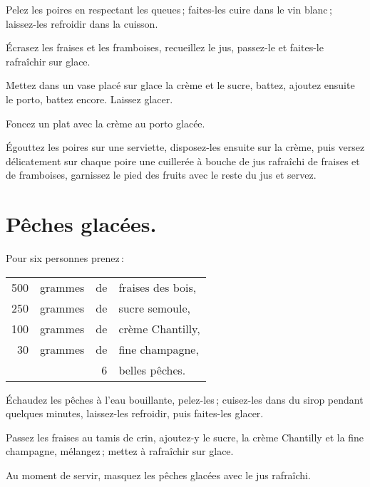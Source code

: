Pelez les poires en respectant les queues ; faites-les cuire dans le vin
blanc ; laissez-les refroidir dans la cuisson.

Écrasez les fraises et les framboises, recueillez le jus, passez-le et
faites-le rafraîchir sur glace.

Mettez dans un vase placé sur glace la crème et le sucre, battez, ajoutez
ensuite le porto, battez encore. Laissez glacer.

Foncez un plat avec la crème au porto glacée.

Égouttez les poires sur une serviette, disposez-les ensuite sur la crème, puis
versez délicatement sur chaque poire une cuillerée à bouche de jus rafraîchi de
fraises et de framboises, garnissez le pied des fruits avec le reste du jus et
servez.

\section*{\centering Pêches glacées.}
{}

Pour six personnes prenez :

\footnotesize
\begin{longtable}{rrrp{16em}}
    500 & grammes & de & fraises des bois,                                                                \\
    250 & grammes & de & sucre semoule,                                                                   \\
    100 & grammes & de & crème Chantilly,                                                                 \\
     30 & grammes & de & fine champagne,                                                                  \\
        &         &  6 & belles pêches.                                                                   \\
\end{longtable}
\normalsize

Échaudez les pêches à l'eau bouillante, pelez-les ; cuisez-les dans du sirop
pendant quelques minutes, laissez-les refroidir, puis faites-les glacer.

Passez les fraises au tamis de crin, ajoutez-y le sucre, la crème Chantilly et
la fine champagne, mélangez ; mettez à rafraîchir sur glace.

Au moment de servir, masquez les pêches glacées avec le jus rafraîchi.

